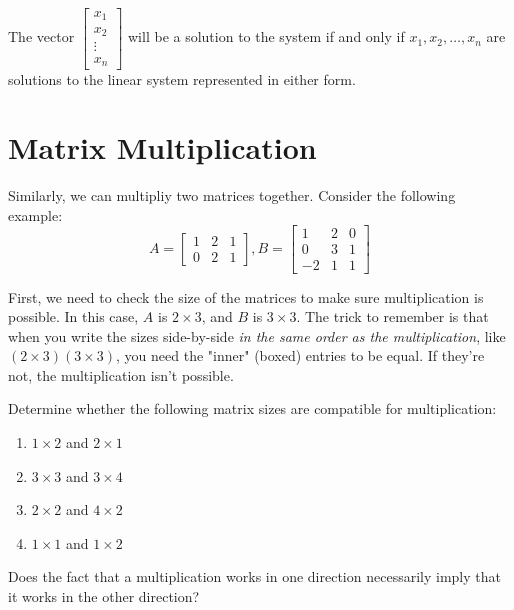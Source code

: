 \documentclass[11pt]{exam}
\begin{document}
    The vector $\begin{bmatrix} x_1 \\ x_2 \\ \vdots \\ x_n \end{bmatrix}$ will be a solution to the system if and only if
    $x_1, x_2, \dots, x_n$ are solutions to the linear system represented in either form.

\pagebreak
\section{Matrix Multiplication}
    Similarly, we can multipliy two matrices together. Consider the following example:
    $$A = \begin{bmatrix} 1 & 2 & 1 \\ 0 & 2 & 1 \end{bmatrix}, B = \begin{bmatrix} 1 & 2 & 0 \\ 0 & 3 & 1 \\ -2 & 1 & 1 \end{bmatrix}$$

    First, we need to check the size of the matrices to make sure multiplication is possible. In this case, $A$ is $2 \times 3$, and
    $B$ is $3 \times 3$. The trick to remember is that when you write the sizes side-by-side \textit{in the same order as the multiplication}, 
    like $(2 \times \boxed{3})(\boxed{3} \times 3)$, you need the "inner" (boxed) entries to be equal. If they're not, the multiplication isn't possible.

    \begin{questions}
        \item Determine whether the following matrix sizes are compatible for multiplication:
        \begin{enumerate}
            \item $1 \times 2$ and $2 \times 1$
            \item $3 \times 3$ and $3 \times 4$
            \item $2 \times 2$ and $4 \times 2$
            \item $1 \times 1$ and $1 \times 2$
        \end{enumerate}
        \item Does the fact that a multiplication works in one direction necessarily imply that it works in the other direction?
    \end{questions}
\end{document}
